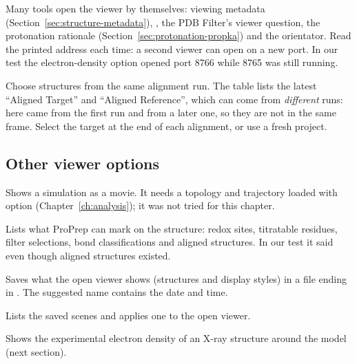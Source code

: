\begin{tip}
Many tools open the viewer by themselves: viewing metadata
(Section~\ref{sec:structure-metadata}), ,
the PDB Filter's viewer question, the protonation rationale
(Section~\ref{sec:protonation-propka}) and the orientator. Read the printed
address each time: a second viewer can open on a new port. In our test the
electron-density option opened port 8766 while 8765 was still running.
\end{tip}

\begin{watchout}
Choose structures from the same alignment run. The table lists the latest
``Aligned Target'' and ``Aligned Reference'', which can come from
\emph{different} runs: here  came from the first run and
 from a later one, so they are not in the same frame.
Select the target at the end of each alignment, or use a fresh project.
\end{watchout}

\subsection{Other viewer options}

\begin{description}[style=nextline]
  \item[2 View the loaded MD trajectory] Shows a simulation as a movie. It
        needs a topology and trajectory loaded with  option 
        (Chapter~\ref{ch:analysis}); it was not tried for this chapter.
  \item[3 Show available annotations] Lists what ProPrep can mark on the
        structure: redox sites, titratable residues, filter selections, bond
        classifications and aligned structures. In our test it said
         even though aligned
        structures existed.
  \item[4 Save the scene] Saves what the open viewer shows (structures and
        display styles) in a file ending in . The suggested
        name contains the date and time.
  \item[5 Load a saved scene] Lists the saved scenes and applies one to the
        open viewer.
  \item[6 Electron density] Shows the experimental electron density of an
        X-ray structure around the model (next section).
\end{description}

